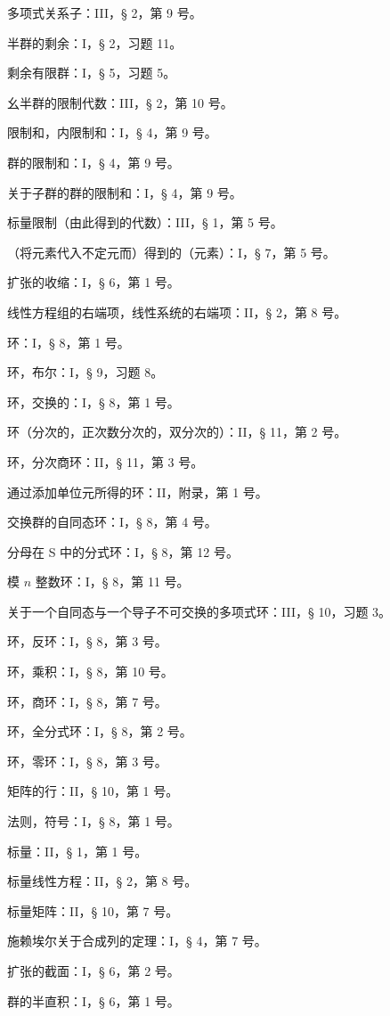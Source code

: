 多项式关系子：III，§ 2，第 9 号。

半群的剩余：I，§ 2，习题 11。

剩余有限群：I，§ 5，习题 5。

幺半群的限制代数：III，§ 2，第 10 号。

限制和，内限制和：I，§ 4，第 9 号。

群的限制和：I，§ 4，第 9 号。

关于子群的群的限制和：I，§ 4，第 9 号。

标量限制（由此得到的代数）：III，§ 1，第 5 号。

（将元素代入不定元而）得到的（元素）：I，§ 7，第 5 号。

扩张的收缩：I，§ 6，第 1 号。

线性方程组的右端项，线性系统的右端项：II，§ 2，第 8 号。

环：I，§ 8，第 1 号。

环，布尔：I，§ 9，习题 8。

环，交换的：I，§ 8，第 1 号。

环（分次的，正次数分次的，双分次的）：II，§ 11，第 2 号。

环，分次商环：II，§ 11，第 3 号。

通过添加单位元所得的环：II，附录，第 1 号。

交换群的自同态环：I，§ 8，第 4 号。

分母在 S 中的分式环：I，§ 8，第 12 号。

模 \(n\) 整数环：I，§ 8，第 11 号。

关于一个自同态与一个导子不可交换的多项式环：III，§ 10，习题 3。

环，反环：I，§ 8，第 3 号。

环，乘积：I，§ 8，第 10 号。

环，商环：I，§ 8，第 7 号。

环，全分式环：I，§ 8，第 2 号。

环，零环：I，§ 8，第 3 号。

矩阵的行：II，§ 10，第 1 号。

法则，符号：I，§ 8，第 1 号。

标量：II，§ 1，第 1 号。

标量线性方程：II，§ 2，第 8 号。

标量矩阵：II，§ 10，第 7 号。

施赖埃尔关于合成列的定理：I，§ 4，第 7 号。

扩张的截面：I，§ 6，第 2 号。

群的半直积：I，§ 6，第 1 号。

